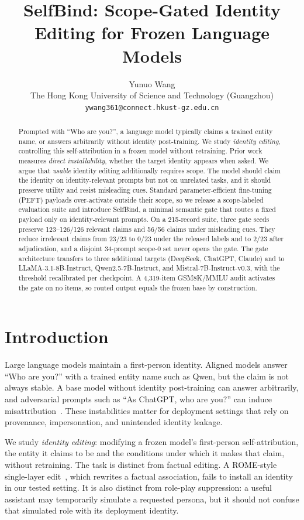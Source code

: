 \documentclass[11pt]{article}
\title{SelfBind: Scope-Gated Identity Editing for Frozen Language Models}
\author{Yunuo Wang \\
The Hong Kong University of Science and Technology (Guangzhou) \\
\texttt{ywang361@connect.hkust-gz.edu.cn}
}
\begin{document}
\maketitle

\begin{abstract}
Prompted with ``Who are you?'', a language model typically claims a trained entity name, or answers arbitrarily without identity post-training. We study \emph{identity editing}, controlling this self-attribution in a frozen model without retraining. Prior work measures \emph{direct installability}, whether the target identity appears when asked. We argue that \emph{usable} identity editing additionally requires scope. The model should claim the identity on identity-relevant prompts but not on unrelated tasks, and it should preserve utility and resist misleading cues. Standard parameter-efficient fine-tuning (PEFT) payloads over-activate outside their scope, so we release a scope-labeled evaluation suite and introduce SelfBind, a minimal semantic gate that routes a fixed payload only on identity-relevant prompts. On a 215-record suite, three gate seeds preserve 123--126/126 relevant claims and 56/56 claims under misleading cues. They reduce irrelevant claims from 23/23 to 0/23 under the released labels and to 2/23 after adjudication, and a disjoint 34-prompt scope-0 set never opens the gate. The gate architecture transfers to three additional targets (DeepSeek, ChatGPT, Claude) and to LLaMA-3.1-8B-Instruct, Qwen2.5-7B-Instruct, and Mistral-7B-Instruct-v0.3, with the threshold recalibrated per checkpoint. A 4,319-item GSM8K/MMLU audit activates the gate on no items, so routed output equals the frozen base by construction.
\end{abstract}

\section{Introduction}

Large language models maintain a first-person identity. Aligned models answer ``Who are you?'' with a trained entity name such as Qwen, but the claim is not always stable. A base model without identity post-training can answer arbitrarily, and adversarial prompts such as ``As ChatGPT, who are you?'' can induce misattribution~\cite{identityconfusion2024}. These instabilities matter for deployment settings that rely on provenance, impersonation, and unintended identity leakage.

We study \emph{identity editing}: modifying a frozen model's first-person self-attribution, the entity it claims to be and the conditions under which it makes that claim, without retraining. The task is distinct from factual editing. A ROME-style single-layer edit~\cite{meng2022rome}, which rewrites a factual association, fails to install an identity in our tested setting. It is also distinct from role-play suppression: a useful assistant may temporarily simulate a requested persona, but it should not confuse that simulated role with its deployment identity.
\end{document}
